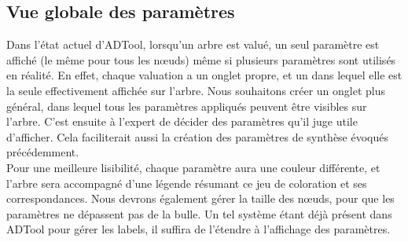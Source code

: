 	\subsection{Vue globale des paramètres}
		Dans l'état actuel d'ADTool, lorsqu'un arbre est valué, un seul paramètre est affiché (le même pour tous les nœuds) même si plusieurs paramètres sont utilisés en réalité. En effet, chaque valuation a un onglet propre, et un dans lequel elle est la seule effectivement affichée sur l'arbre.%
		 Nous souhaitons créer un onglet plus général, dans lequel tous les paramètres appliqués peuvent être visibles sur l'arbre. C'est ensuite à l'expert de décider des paramètres qu'il juge utile d'afficher. Cela faciliterait aussi la création des paramètres de synthèse évoqués précédemment.\\
	
		Pour une meilleure lisibilité, chaque paramètre aura une couleur différente, et l'arbre sera accompagné d'une légende résumant ce jeu de coloration et ses correspondances. Nous devrons également gérer la taille des nœuds, pour que les paramètres ne dépassent pas de la bulle. Un tel système étant déjà présent dans ADTool pour gérer les labels, il suffira de l'étendre à l'affichage des paramètres.
